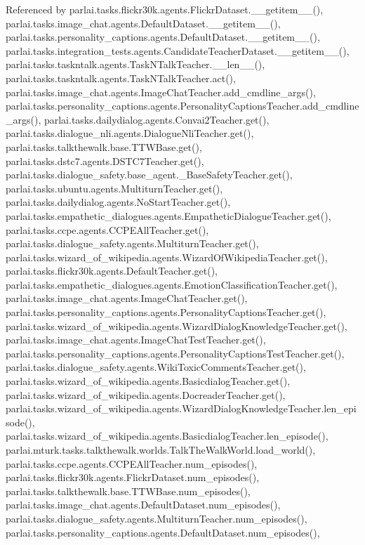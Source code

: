 Referenced by parlai.\+tasks.\+flickr30k.\+agents.\+Flickr\+Dataset.\+\_\+\+\_\+getitem\+\_\+\+\_\+(), parlai.\+tasks.\+image\+\_\+chat.\+agents.\+Default\+Dataset.\+\_\+\+\_\+getitem\+\_\+\+\_\+(), parlai.\+tasks.\+personality\+\_\+captions.\+agents.\+Default\+Dataset.\+\_\+\+\_\+getitem\+\_\+\+\_\+(), parlai.\+tasks.\+integration\+\_\+tests.\+agents.\+Candidate\+Teacher\+Dataset.\+\_\+\+\_\+getitem\+\_\+\+\_\+(), parlai.\+tasks.\+taskntalk.\+agents.\+Task\+N\+Talk\+Teacher.\+\_\+\+\_\+len\+\_\+\+\_\+(), parlai.\+tasks.\+taskntalk.\+agents.\+Task\+N\+Talk\+Teacher.\+act(), parlai.\+tasks.\+image\+\_\+chat.\+agents.\+Image\+Chat\+Teacher.\+add\+\_\+cmdline\+\_\+args(), parlai.\+tasks.\+personality\+\_\+captions.\+agents.\+Personality\+Captions\+Teacher.\+add\+\_\+cmdline\+\_\+args(), parlai.\+tasks.\+dailydialog.\+agents.\+Convai2\+Teacher.\+get(), parlai.\+tasks.\+dialogue\+\_\+nli.\+agents.\+Dialogue\+Nli\+Teacher.\+get(), parlai.\+tasks.\+talkthewalk.\+base.\+T\+T\+W\+Base.\+get(), parlai.\+tasks.\+dstc7.\+agents.\+D\+S\+T\+C7\+Teacher.\+get(), parlai.\+tasks.\+dialogue\+\_\+safety.\+base\+\_\+agent.\+\_\+\+Base\+Safety\+Teacher.\+get(), parlai.\+tasks.\+ubuntu.\+agents.\+Multiturn\+Teacher.\+get(), parlai.\+tasks.\+dailydialog.\+agents.\+No\+Start\+Teacher.\+get(), parlai.\+tasks.\+empathetic\+\_\+dialogues.\+agents.\+Empathetic\+Dialogue\+Teacher.\+get(), parlai.\+tasks.\+ccpe.\+agents.\+C\+C\+P\+E\+All\+Teacher.\+get(), parlai.\+tasks.\+dialogue\+\_\+safety.\+agents.\+Multiturn\+Teacher.\+get(), parlai.\+tasks.\+wizard\+\_\+of\+\_\+wikipedia.\+agents.\+Wizard\+Of\+Wikipedia\+Teacher.\+get(), parlai.\+tasks.\+flickr30k.\+agents.\+Default\+Teacher.\+get(), parlai.\+tasks.\+empathetic\+\_\+dialogues.\+agents.\+Emotion\+Classification\+Teacher.\+get(), parlai.\+tasks.\+image\+\_\+chat.\+agents.\+Image\+Chat\+Teacher.\+get(), parlai.\+tasks.\+personality\+\_\+captions.\+agents.\+Personality\+Captions\+Teacher.\+get(), parlai.\+tasks.\+wizard\+\_\+of\+\_\+wikipedia.\+agents.\+Wizard\+Dialog\+Knowledge\+Teacher.\+get(), parlai.\+tasks.\+image\+\_\+chat.\+agents.\+Image\+Chat\+Test\+Teacher.\+get(), parlai.\+tasks.\+personality\+\_\+captions.\+agents.\+Personality\+Captions\+Test\+Teacher.\+get(), parlai.\+tasks.\+dialogue\+\_\+safety.\+agents.\+Wiki\+Toxic\+Comments\+Teacher.\+get(), parlai.\+tasks.\+wizard\+\_\+of\+\_\+wikipedia.\+agents.\+Basicdialog\+Teacher.\+get(), parlai.\+tasks.\+wizard\+\_\+of\+\_\+wikipedia.\+agents.\+Docreader\+Teacher.\+get(), parlai.\+tasks.\+wizard\+\_\+of\+\_\+wikipedia.\+agents.\+Wizard\+Dialog\+Knowledge\+Teacher.\+len\+\_\+episode(), parlai.\+tasks.\+wizard\+\_\+of\+\_\+wikipedia.\+agents.\+Basicdialog\+Teacher.\+len\+\_\+episode(), parlai.\+mturk.\+tasks.\+talkthewalk.\+worlds.\+Talk\+The\+Walk\+World.\+load\+\_\+world(), parlai.\+tasks.\+ccpe.\+agents.\+C\+C\+P\+E\+All\+Teacher.\+num\+\_\+episodes(), parlai.\+tasks.\+flickr30k.\+agents.\+Flickr\+Dataset.\+num\+\_\+episodes(), parlai.\+tasks.\+talkthewalk.\+base.\+T\+T\+W\+Base.\+num\+\_\+episodes(), parlai.\+tasks.\+image\+\_\+chat.\+agents.\+Default\+Dataset.\+num\+\_\+episodes(), parlai.\+tasks.\+dialogue\+\_\+safety.\+agents.\+Multiturn\+Teacher.\+num\+\_\+episodes(), parlai.\+tasks.\+personality\+\_\+captions.\+agents.\+Default\+Dataset.\+num\+\_\+episodes(), 